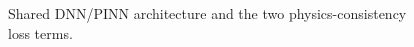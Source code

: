 \documentclass[11pt,a4paper]{report}
\begin{document}
\begin{figure}[!htbp]
\centering
{}
\caption{Shared DNN/PINN architecture and the two physics-consistency loss terms.}
\label{fig:model-architecture}
\end{figure}
\end{document}
